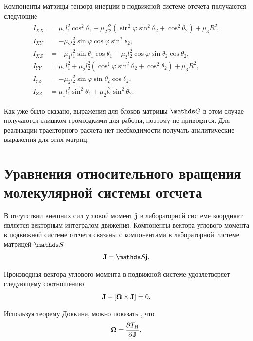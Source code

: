 Компоненты матрицы тензора инерции в подвижной системе отсчета получаются следующие
\begin{gather}
    \begin{aligned}
        I_{XX} &= \mu_1 l_1^2 \cos^2 \theta_1 + \mu_2 l_2^2 (\sin^2 \varphi \sin^2 \theta_2 + \cos^2 \theta_2) + \mu_3 R^2, \\ 
        I_{XY} &= -\mu_2 l_2^2 \sin \varphi \cos \varphi \sin^2 \theta_2, \\ 
        I_{XZ} &= -\mu_1 l_1^2 \sin \theta_1 \cos \theta_1 - \mu_2 l_2^2 \cos \varphi \sin \theta_2 \cos \theta_2, \\
        I_{YY} &= \mu_1 l_1^2 + \mu_2 l_2^2 (\cos^2 \varphi \sin^2 \theta_2 + \cos^2 \theta_2) + \mu_3 R^2, \\
        I_{YZ} &= -\mu_2 l_2^2 \sin \varphi \sin \theta_2 \cos \theta_2, \\
        I_{ZZ} &= \mu_1 l_1^2 \sin^2 \theta_1 + \mu_2 l_2^2 \sin^2 \theta_2.  
    \end{aligned} 
\end{gather}

Как уже было сказано, выражения для блоков матрицы $\bbG$ в этом случае получаются слишком громоздкими для работы, поэтому не приводятся. Для реализации траекторного расчета нет необходимости получать аналитические выражения для этих матриц. 

\section{Уравнения относительного вращения молекулярной системы отсчета} \label{section:rotational-dynamics}

В отсутствии внешних сил угловой момент $\mathbf{j}$ в лабораторной системе координат является векторным интегралом движения. Компоненты вектора углового момента в подвижной системе отсчета связаны с компонентами в лабораторной системе матрицей $\bbS$
\begin{gather}
    \mf{J} = \bbS \mf{j}. \label{polyatom-j-connection}
\end{gather}

Производная вектора углового момента в подвижной системе удовлетворяет следующему соотношению \cite{goldstein}
\begin{gather}
    \dot{\mathbf{J}} + \left[ \boldsymbol{\Omega} \times \mathbf{J} \right] = 0.
\end{gather}

Используя теорему Донкина, можно показать \cite{petrov2015}, что 
\begin{gather}
    \boldsymbol{\Omega} = \frac{\partial T_\text{H}}{\partial \mathbf{J}}. 
\end{gather}

